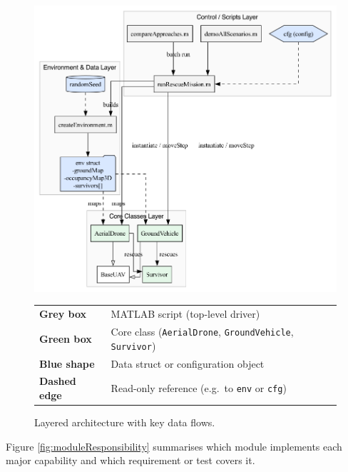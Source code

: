 \documentclass[12pt,a4paper]{report}
\begin{document}
\begin{figure}[H]
  \centering
  \includegraphics[width=.70\textwidth]{figures/UML}

  \vspace{0.4em}
  \begin{minipage}{.70\textwidth}
    \setlength{\tabcolsep}{5pt}
    \renewcommand{\arraystretch}{1.12}
    \begin{tabularx}{\linewidth}{@{}>{\raggedright\arraybackslash}p{2.6cm}X@{}}
      \rowcolor[HTML]{F2F2F2}\textbf{Grey box}   & MATLAB script (top-level driver) \\[2pt]
      \rowcolor[HTML]{E4F7E8}\textbf{Green box}  & Core class (\texttt{AerialDrone}, \texttt{GroundVehicle}, \texttt{Survivor}) \\[2pt]
      \rowcolor[HTML]{D9E8FF}\textbf{Blue shape} & Data struct or configuration object \\[2pt]
      \cellcolor{white}\textbf{Dashed edge}      & Read-only reference (e.g.\ to \texttt{env} or \texttt{cfg}) \\
    \end{tabularx}
  \end{minipage}

  \caption{Layered architecture with key data flows.}
  \label{fig:architectureDiagram}
\end{figure}

Figure \ref{fig:moduleResponsibility} summarises which module implements
each major capability and which requirement or test covers it.
\end{document}
